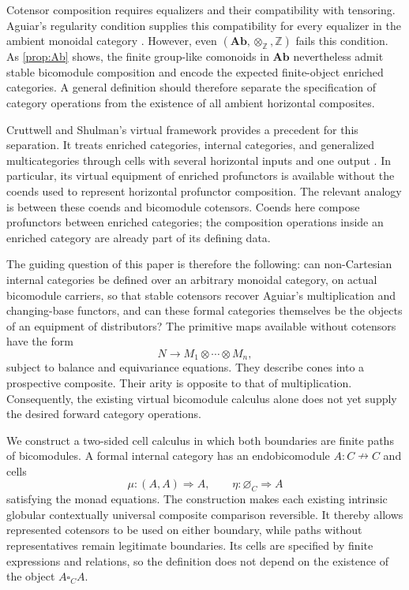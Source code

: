 \documentclass[11pt,reqno]{amsart}
\theoremstyle{plain}
\theoremstyle{definition}
\theoremstyle{remark}
\numberwithin{equation}{section}
\newcommand{\harr}{\mathrel{\nrightarrow}}
\newcommand{\cell}{\mathrel{\Longrightarrow}}
\newcommand{\emp}[1]{\varnothing_{#1}}
\newcommand{\Ab}{\mathbf{Ab}}
\begin{document}
Cotensor composition requires equalizers and their compatibility with
tensoring. Aguiar's regularity condition supplies this compatibility for
every equalizer in the ambient monoidal category
\cite[Definition 2.1.1]{Aguiar1997}. However, even
$(\Ab,\otimes_{\mathbb Z},\mathbb Z)$ fails this condition. As
\cref{prop:Ab} shows, the finite group-like comonoids in $\Ab$
nevertheless admit stable bicomodule composition and encode the expected
finite-object enriched categories. A general definition should therefore
separate the specification of category operations from the existence of
all ambient horizontal composites.

Cruttwell and Shulman's virtual framework provides a precedent for this
separation. It treats enriched categories, internal categories, and
generalized multicategories through cells with several horizontal inputs
and one output \cite{CruttwellShulman2010}. In particular, its virtual
equipment of enriched profunctors is available without the coends used
to represent horizontal profunctor composition. The relevant analogy is
between these coends and bicomodule cotensors. Coends here compose
profunctors between enriched categories; the composition operations inside
an enriched category are already part of its defining data.

The guiding question of this paper is therefore the following: can
non-Cartesian internal categories be defined over an arbitrary monoidal
category, on actual bicomodule carriers, so that stable cotensors recover
Aguiar's multiplication and changing-base functors, and can these formal
categories themselves be the objects of an equipment of distributors?
The primitive maps
available without cotensors have the form
\[
 N\longrightarrow M_1\otimes\cdots\otimes M_n,
\]
subject to balance and equivariance equations. They describe cones into a
prospective composite. Their arity is opposite to that of multiplication.
Consequently, the existing virtual bicomodule calculus alone does not yet
supply the desired forward category operations.

We construct a two-sided cell calculus in which both boundaries are finite
paths of bicomodules. A formal internal category has an endobicomodule
$A:C\harr C$ and cells
\begin{equation}\label{eq:shape}
 \mu:(A,A)\cell A,\qquad \eta:\emp C\cell A
\end{equation}
satisfying the monad equations. The construction makes each existing intrinsic globular
contextually universal composite comparison reversible. It thereby allows
represented cotensors to be used on either boundary, while paths without
representatives remain legitimate boundaries. Its cells are specified by
finite expressions and relations, so the definition does not depend on
the existence of the object $A\square_C A$.
\end{document}
